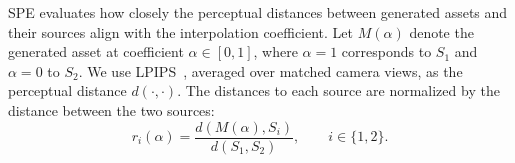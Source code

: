 

SPE evaluates how closely the perceptual distances between generated assets and their sources align with the interpolation coefficient. Let $M(\alpha)$ denote the generated asset at coefficient $\alpha\in[0,1]$, where $\alpha=1$ corresponds to $S_1$ and $\alpha=0$ to $S_2$. We use LPIPS~\cite{zhang2018lpips}, averaged over matched camera views, as the perceptual distance $d(\cdot,\cdot)$. The distances to each source are normalized by the distance between the two sources:
\begin{equation}
 r_i(\alpha)=
 \frac{d(M(\alpha),S_i)}{d(S_1,S_2)},
 \qquad i\in\{1,2\}.
\end{equation}

